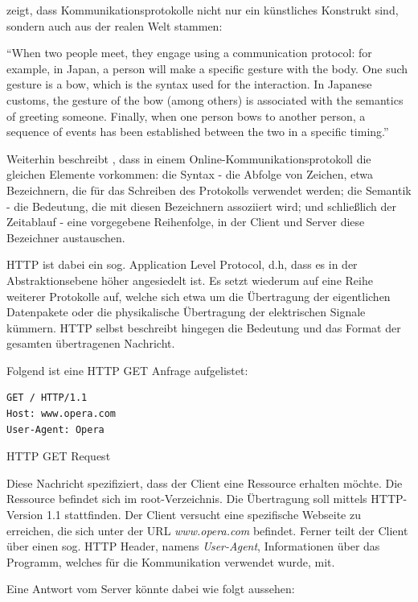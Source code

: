 \cite{Dubost:2012} zeigt, dass Kommunikationsprotokolle nicht nur ein künstliches Konstrukt sind, sondern auch aus der realen Welt stammen:

\enquote{When two people meet, they engage using a communication protocol: for example, in Japan, a person will make a specific gesture with the body. One such gesture is a bow, which is the syntax used for the interaction. In Japanese customs, the gesture of the bow (among others) is associated with the semantics of greeting someone. Finally, when one person bows to another person, a sequence of events has been established between the two in a specific timing.}

Weiterhin beschreibt \cite{Dubost:2012}, dass in einem Online-Kommunikationsprotokoll die gleichen Elemente vorkommen: die Syntax - die Abfolge von Zeichen, etwa Bezeichnern, die für das Schreiben des Protokolls verwendet werden; die Semantik - die Bedeutung, die mit diesen Bezeichnern assoziiert wird; und schließlich der Zeitablauf - eine vorgegebene Reihenfolge, in der Client und Server diese Bezeichner austauschen.

HTTP ist dabei ein sog. Application Level Protocol, d.h, dass es in der Abstraktionsebene höher angesiedelt ist. Es setzt wiederum auf eine Reihe weiterer Protokolle auf, welche sich etwa um die Übertragung der eigentlichen Datenpakete oder die physikalische Übertragung der elektrischen Signale kümmern. HTTP selbst beschreibt hingegen die Bedeutung und das Format der gesamten übertragenen Nachricht.

Folgend ist eine HTTP GET Anfrage aufgelistet:

\begin{listing}[H]
\begin{verbatim}
GET / HTTP/1.1
Host: www.opera.com
User-Agent: Opera
\end{verbatim}
\caption{HTTP GET Request}
\end{listing}

Diese Nachricht spezifiziert, dass der Client eine Ressource erhalten möchte.
Die Ressource befindet sich im root-Verzeichnis.
Die Übertragung soll mittels HTTP-Version 1.1 stattfinden. Der Client versucht eine spezifische Webseite zu erreichen, die sich unter der URL \emph{www.opera.com} befindet. Ferner teilt der Client über einen sog. HTTP Header, namens \emph{User-Agent}, Informationen über das Programm, welches für die Kommunikation verwendet wurde, mit.

Eine Antwort vom Server könnte dabei wie folgt aussehen:

